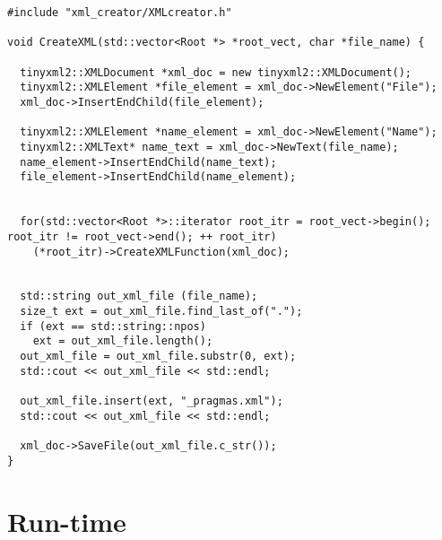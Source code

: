 \documentclass[a4paper,11pt,twoside]{book}
\begin{document}
\begin{lstlisting}[language=CCC, caption=xml\_creator/xml\_creator.cpp]
#include "xml_creator/XMLcreator.h"

void CreateXML(std::vector<Root *> *root_vect, char *file_name) {
  
  tinyxml2::XMLDocument *xml_doc = new tinyxml2::XMLDocument();
  tinyxml2::XMLElement *file_element = xml_doc->NewElement("File");
  xml_doc->InsertEndChild(file_element);

  tinyxml2::XMLElement *name_element = xml_doc->NewElement("Name");
  tinyxml2::XMLText* name_text = xml_doc->NewText(file_name);
  name_element->InsertEndChild(name_text);
  file_element->InsertEndChild(name_element);


  for(std::vector<Root *>::iterator root_itr = root_vect->begin(); root_itr != root_vect->end(); ++ root_itr)     
    (*root_itr)->CreateXMLFunction(xml_doc);
  

  std::string out_xml_file (file_name);
  size_t ext = out_xml_file.find_last_of(".");
  if (ext == std::string::npos)
    ext = out_xml_file.length();
  out_xml_file = out_xml_file.substr(0, ext);
  std::cout << out_xml_file << std::endl;
  
  out_xml_file.insert(ext, "_pragmas.xml");
  std::cout << out_xml_file << std::endl;

  xml_doc->SaveFile(out_xml_file.c_str());
}
\end{lstlisting}


\section{Run-time}
\end{document}
